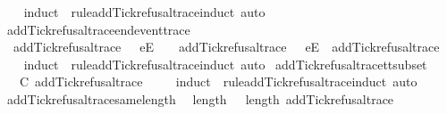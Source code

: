 %
\isadelimproof
\ \ %
\endisadelimproof
%
\isatagproof
{}\isamarkupfalse%
\ {\isacharparenleft}induct\ {\isasymrho}\ rule{\isacharcolon}add{\isacharunderscore}Tick{\isacharunderscore}refusal{\isacharunderscore}trace{\isachardot}induct{\isacharcomma}\ auto{\isacharparenright}%
\endisatagproof
{\isafoldproof}%
%
\isadelimproof
\isanewline
%
\endisadelimproof
\isanewline
{}\isamarkupfalse%
\ add{\isacharunderscore}Tick{\isacharunderscore}refusal{\isacharunderscore}trace{\isacharunderscore}end{\isacharunderscore}event{\isacharunderscore}trace{\isacharcolon}\isanewline
\ \ {\isachardoublequoteopen}add{\isacharunderscore}Tick{\isacharunderscore}refusal{\isacharunderscore}trace\ {\isacharparenleft}{\isasymrho}\ {\isacharat}\ {\isacharbrackleft}e{\isacharbrackright}\isactrlsub E\ {\isacharhash}\ {\isasymsigma}{\isacharparenright}\ {\isacharequal}\ add{\isacharunderscore}Tick{\isacharunderscore}refusal{\isacharunderscore}trace\ {\isasymrho}\ {\isacharat}\ {\isacharbrackleft}e{\isacharbrackright}\isactrlsub E\ {\isacharhash}\ add{\isacharunderscore}Tick{\isacharunderscore}refusal{\isacharunderscore}trace\ {\isasymsigma}{\isachardoublequoteclose}\isanewline
%
\isadelimproof
\ \ %
\endisadelimproof
%
\isatagproof
{}\isamarkupfalse%
\ {\isacharparenleft}induct\ {\isasymrho}\ rule{\isacharcolon}add{\isacharunderscore}Tick{\isacharunderscore}refusal{\isacharunderscore}trace{\isachardot}induct{\isacharcomma}\ auto{\isacharparenright}%
\endisatagproof
{\isafoldproof}%
%
\isadelimproof
\isanewline
%
\endisadelimproof
\isanewline
{}\isamarkupfalse%
\ add{\isacharunderscore}Tick{\isacharunderscore}refusal{\isacharunderscore}trace{\isacharunderscore}tt{\isacharunderscore}subset{\isacharcolon}\isanewline
\ \ {\isachardoublequoteopen}{\isasymrho}\ {\isasymsubseteq}\isactrlsub C\ add{\isacharunderscore}Tick{\isacharunderscore}refusal{\isacharunderscore}trace\ {\isasymrho}{\isachardoublequoteclose}\isanewline
%
\isadelimproof
\ \ %
\endisadelimproof
%
\isatagproof
{}\isamarkupfalse%
\ {\isacharparenleft}induct\ {\isasymrho}\ rule{\isacharcolon}add{\isacharunderscore}Tick{\isacharunderscore}refusal{\isacharunderscore}trace{\isachardot}induct{\isacharcomma}\ auto{\isacharparenright}%
\endisatagproof
{\isafoldproof}%
%
\isadelimproof
\isanewline
%
\endisadelimproof
\isanewline
{}\isamarkupfalse%
\ add{\isacharunderscore}Tick{\isacharunderscore}refusal{\isacharunderscore}trace{\isacharunderscore}same{\isacharunderscore}length{\isacharcolon}\isanewline
\ \ {\isachardoublequoteopen}length\ {\isasymrho}\ {\isacharequal}\ length\ {\isacharparenleft}add{\isacharunderscore}Tick{\isacharunderscore}refusal{\isacharunderscore}trace\ {\isasymrho}{\isacharparenright}{\isachardoublequoteclose}\isanewline
